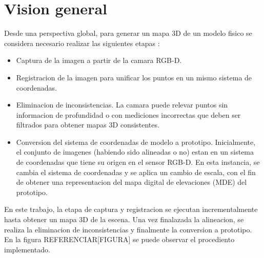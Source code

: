 \chapter{Vision general}

Desde una perspectiva global, para generar un mapa 3D de un modelo fisico se considera necesario realizar las siguientes etapas :
\begin{itemize}

\item Captura de la imagen a partir de la camara RGB-D.

\item Registracion de la imagen para unificar los puntos en un mismo sistema de coordenadas.

\item Eliminacion de inconsistencias. La camara puede relevar puntos sin informacion de profundidad o con mediciones incorrectas que deben ser filtrados para obtener mapas 3D consistentes. 

\item Conversion del sistema de coordenadas de modelo a prototipo. Inicialmente, el conjunto de imagenes (habiendo sido alineadas o no) estan en un sistema de coordenadas que tiene su origen en el sensor RGB-D. En esta instancia, se cambia el sistema de coordenadas y se aplica un cambio de escala, con el fin de obtener una representacion del mapa digital de elevaciones (MDE) del prototipo.

\end{itemize}

En este trabajo, la etapa de captura y registracion se ejecutan incrementalmente hasta obtener un mapa 3D de la escena. Una vez finalazada la alineacion, se realiza la eliminacion de inconsistencias y finalmente la conversion a prototipo. En la figura REFERENCIAR[FIGURA] se puede observar el procediento implementado.

